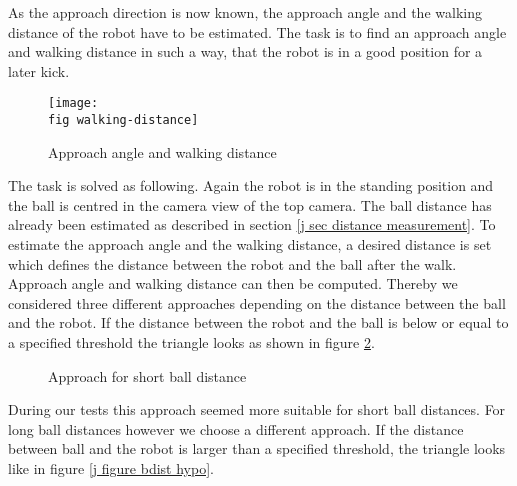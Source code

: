 As the approach direction is now known, the approach angle and the walking
distance of the robot have to be estimated. The task is to find an approach
angle and walking distance in such a way, that the robot is in a good position
for a later kick.

\begin{figure}[ht]
  \texttt{[image: \\fig walking-distance]}
  \caption{Approach angle and walking distance}
  \label{j figure approach angle and walking distance}
\end{figure}


The task is solved as following. Again the robot is in the standing position
and the ball is centred in the camera view of the top camera. The ball
distance has already been estimated as described in section \ref{j sec distance
  measurement}. To estimate the approach angle and the walking distance, a
desired distance is set which defines the distance between the robot and
the ball after the walk. Approach angle and walking distance can then be
computed. Thereby we considered three different approaches depending on the
distance between the ball and the robot. If the distance between the robot and
the ball is below or equal to a specified threshold the triangle looks as shown
in figure \ref{j figure rdist hypo}.

\begin{figure}[ht]
  \centering
  \caption{Approach for short ball distance}
  \label{j figure rdist hypo}
\end{figure}


During our tests this approach seemed more suitable for short ball distances.
For long ball distances however we choose a different approach. If the distance
between ball and the robot is larger than a specified threshold, the triangle
looks like in figure \ref{j figure bdist hypo}.

